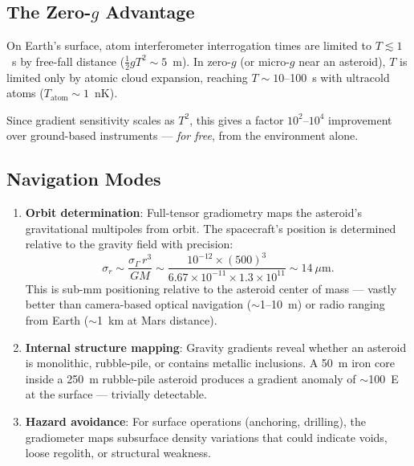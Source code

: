 \documentclass[11pt]{article}
\theoremstyle{definition}
\theoremstyle{remark}
\newcommand{\ee}[1]{\times10^{#1}}
\begin{document}
\subsection{The Zero-$g$ Advantage}

On Earth's surface, atom interferometer interrogation times are limited
to $T \lesssim 1$~s by free-fall distance ($\frac{1}{2}gT^2 \sim 5$~m).
In zero-$g$ (or micro-$g$ near an asteroid), $T$ is limited only by
atomic cloud expansion, reaching $T \sim 10$--100~s with ultracold
atoms ($T_{\text{atom}} \sim 1$~nK).

Since gradient sensitivity scales as $T^2$, this gives a factor
$10^2$--$10^4$ improvement over ground-based instruments ---
\emph{for free}, from the environment alone.

\subsection{Navigation Modes}

\begin{enumerate}
  \item \textbf{Orbit determination}: Full-tensor gradiometry maps
    the asteroid's gravitational multipoles from orbit. The
    spacecraft's position is determined relative to the gravity
    field with precision:
    \begin{equation}
      \sigma_r \sim \frac{\sigma_\Gamma \, r^3}{G M}
      \sim \frac{10^{-12} \times (500)^3}{6.67\ee{-11} \times 1.3\ee{11}}
      \sim 14~\mu\text{m}.
    \end{equation}
    This is sub-mm positioning relative to the asteroid center of
    mass --- vastly better than camera-based optical navigation
    ($\sim$1--10~m) or radio ranging from Earth ($\sim$1~km at
    Mars distance).

  \item \textbf{Internal structure mapping}: Gravity gradients reveal
    whether an asteroid is monolithic, rubble-pile, or contains
    metallic inclusions. A 50~m iron core inside a 250~m rubble-pile
    asteroid produces a gradient anomaly of $\sim$100~E at the
    surface --- trivially detectable.

  \item \textbf{Hazard avoidance}: For surface operations (anchoring,
    drilling), the gradiometer maps subsurface density variations
    that could indicate voids, loose regolith, or structural weakness.
\end{enumerate}
\end{document}
